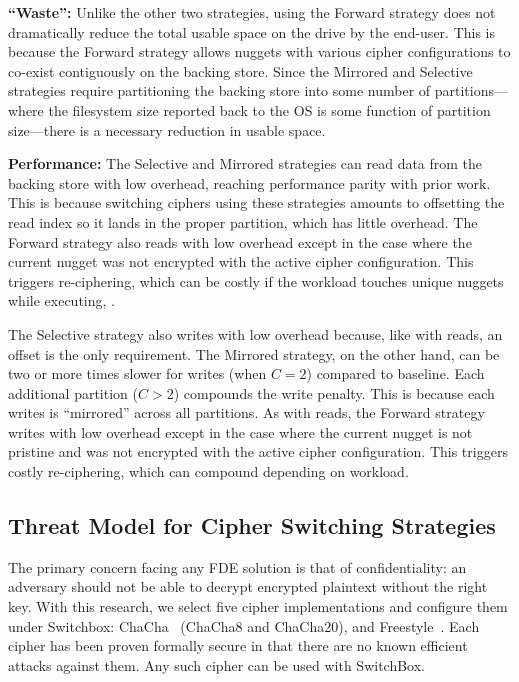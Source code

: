 \textbf{``Waste'':} Unlike the other two strategies, using
the Forward strategy does not dramatically reduce the total usable space on the
drive by the end-user. This is because the Forward strategy allows nuggets with
various cipher configurations to co-exist contiguously on the backing store.
Since the Mirrored and Selective strategies require partitioning the backing
store into some number of partitions---where the filesystem size reported back
to the OS is some function of partition size---there is a necessary reduction in
usable space.

\textbf{Performance:} The Selective and Mirrored strategies can read data
from the backing store with low overhead, reaching performance parity with prior
work. This is because switching ciphers using these strategies amounts to
offsetting the read index so it lands in the proper partition, which has little
overhead. The Forward strategy also reads with low overhead except in the case
where the current nugget was not encrypted with the active cipher configuration.
This triggers re-ciphering, which can be costly if the workload touches unique
nuggets while executing, .

The Selective strategy also writes with low overhead because, like with reads,
an offset is the only requirement. The Mirrored strategy, on the other hand, can
be two or more times slower for writes (when $C = 2$) compared to baseline. Each
additional partition ($C > 2$) compounds the write penalty. This is because each
writes is ``mirrored'' across all partitions. As with reads, the Forward
strategy writes with low overhead except in the case where the current nugget is
not pristine and was not encrypted with the active cipher configuration. This
triggers costly re-ciphering, which can compound depending on workload.

\subsection{Threat Model for Cipher Switching Strategies}

The primary concern facing any FDE solution is that of confidentiality: an
adversary should not be able to decrypt encrypted plaintext without the right
key. With this research, we select five cipher implementations and configure
them under Switchbox: ChaCha~\cite{ChaCha20} (ChaCha8 and ChaCha20), and
Freestyle~\cite{Freestyle}.  Each cipher has been proven formally secure in that
there are no known efficient attacks against them. Any such cipher can be used
with SwitchBox.


